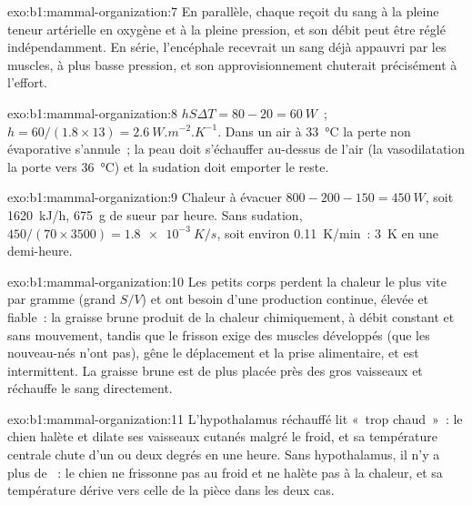 \begin{solution}{exo:b1:mammal-organization:7}
En parallèle, chaque  reçoit du sang à la pleine teneur artérielle
en oxygène et à la pleine pression, et son débit peut être réglé
indépendamment. En série, l'encéphale recevrait un sang déjà appauvri
par les muscles, à plus basse pression, et son approvisionnement
chuterait précisément à l'effort.
\end{solution}

\begin{solution}{exo:b1:mammal-organization:8}
$hS\Delta T = 80 - 20 = \qty{60}{W}$~; $h = 60/(1.8\times 13) =
\qty{2.6}{W.m^{-2}.K^{-1}}$. Dans un air à \qty{33}{\celsius} la perte
non évaporative s'annule~; la peau doit s'échauffer au-dessus de l'air
(la vasodilatation la porte vers \qty{36}{\celsius}) et la sudation doit
emporter le reste.
\end{solution}

\begin{solution}{exo:b1:mammal-organization:9}
Chaleur à évacuer $800 - 200 - 150 = \qty{450}{W}$, soit
\qty{1620}{kJ/h}, \qty{675}{g} de sueur par heure. Sans sudation,
$450/(70\times 3500) =
\qty{1.8e-3}{K/s}$, soit environ \qty{0.11}{K/min}~: \qty{3}{K} en une
demi-heure.
\end{solution}

\begin{solution}{exo:b1:mammal-organization:10}
Les petits corps perdent la chaleur le plus vite par gramme (grand
$S/V$) et ont besoin d'une production continue, élevée et fiable~: la
graisse brune produit de la chaleur chimiquement, à débit constant et
sans mouvement, tandis que le frisson exige des muscles développés (que
les nouveau-nés n'ont pas), gêne le déplacement et la prise alimentaire,
et est intermittent. La graisse brune est de plus placée près des gros
vaisseaux et réchauffe le sang directement.
\end{solution}

\begin{solution}{exo:b1:mammal-organization:11}
L'hypothalamus réchauffé lit «~trop chaud~»~: le chien halète et dilate
ses vaisseaux cutanés malgré le froid, et sa température centrale chute
d'un ou deux degrés en une heure. Sans hypothalamus, il n'y a plus de
~: le chien ne frissonne pas au froid et ne halète pas
à la chaleur, et sa température dérive vers celle de la pièce dans les
deux cas.
\end{solution}

